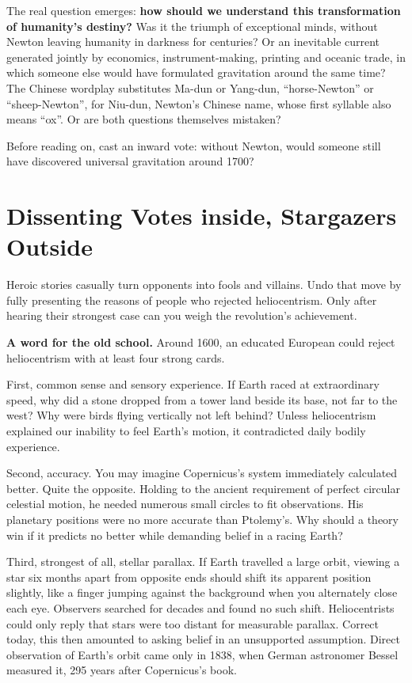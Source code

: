The real question emerges: \textbf{how should we understand this transformation of humanity's destiny?} Was it the triumph of exceptional minds, without Newton leaving humanity in darkness for centuries? Or an inevitable current generated jointly by economics, instrument-making, printing and oceanic trade, in which someone else would have formulated gravitation around the same time? The Chinese wordplay substitutes Ma-dun or Yang-dun, ``horse-Newton'' or ``sheep-Newton'', for Niu-dun, Newton's Chinese name, whose first syllable also means ``ox''. Or are both questions themselves mistaken?

Before reading on, cast an inward vote: without Newton, would someone still have discovered universal gravitation around 1700?

\section[Opponents and Other Observers]{Dissenting Votes inside, Stargazers Outside}
Heroic stories casually turn opponents into fools and villains. Undo that move by fully presenting the reasons of people who rejected heliocentrism. Only after hearing their strongest case can you weigh the revolution's achievement.

\textbf{A word for the old school.} Around 1600, an educated European could reject heliocentrism with at least four strong cards.

First, common sense and sensory experience. If Earth raced at extraordinary speed, why did a stone dropped from a tower land beside its base, not far to the west? Why were birds flying vertically not left behind? Unless heliocentrism explained our inability to feel Earth's motion, it contradicted daily bodily experience.

Second, accuracy. You may imagine Copernicus's system immediately calculated better. Quite the opposite. Holding to the ancient requirement of perfect circular celestial motion, he needed numerous small circles to fit observations. His planetary positions were no more accurate than Ptolemy's. Why should a theory win if it predicts no better while demanding belief in a racing Earth?

Third, strongest of all, stellar parallax. If Earth travelled a large orbit, viewing a star six months apart from opposite ends should shift its apparent position slightly, like a finger jumping against the background when you alternately close each eye. Observers searched for decades and found no such shift. Heliocentrists could only reply that stars were too distant for measurable parallax. Correct today, this then amounted to asking belief in an unsupported assumption. Direct observation of Earth's orbit came only in 1838, when German astronomer Bessel measured it, 295 years after Copernicus's book.

